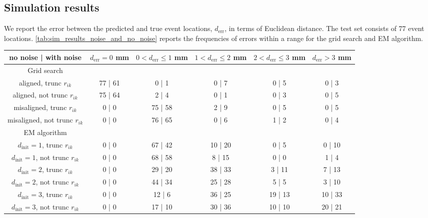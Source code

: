 \subsection{Simulation results}

We report the error between the predicted and true event locations, 
$d_{\text{err}}$, in terms of Euclidean distance. 
The test set consists of 77 event locations.
\cref{tab:sim_results_noise_and_no_noise} reports the frequencies of errors  
within a range for the grid search and EM algorithm.

\begin{table*}
\begin{tabular}{ |c|ccccc| } 
 \hline
 no noise | with noise  & $d_{\text{err}}=0$ mm & $0<d_{\text{err}}\leq1$ mm & $1<d_{\text{err}}\leq2$ mm & $2<d_{\text{err}}\leq3$ mm & $d_{\text{err}}>3$ mm \\ 
 \hline
 Grid search & & & & & \\
 aligned, trunc $r_{ik}$        & 77 | 61 & 0 | 1 & 0 | 7 & 0 | 5 & 0 | 3 \\ 
 aligned, not trunc $r_{ik}$    & 75 | 64  & 2 | 4 & 0 | 1 & 0 | 3 & 0 | 5 \\ 
 misaligned, trunc $r_{ik}$     & 0 | 0  & 75 | 58 & 2 | 9 & 0 | 5 & 0 | 5 \\
 misaligned, not trunc $r_{ik}$ & 0 | 0  & 76 | 65 & 0 | 6 & 1 | 2 & 0 | 4 \\
 \hline
 EM algorithm & & & & & \\
 $d_\text{init}=1$, trunc $r_{ik}$       & 0 | 0  & 67 | 42 & 10 | 20 & 0 | 5 & 0 | 10 \\
 $d_\text{init}=1$, not trunc $r_{ik}$   & 0 | 0  & 68 | 58 & 8 | 15 & 0 | 0 & 1 | 4 \\
 $d_\text{init}=2$, trunc $r_{ik}$       & 0 | 0  & 29 | 20 & 38 | 33 & 3 | 11 & 7 | 13 \\
 $d_\text{init}=2$, not trunc $r_{ik}$   & 0 | 0  & 44 | 34 & 25 | 28 & 5 | 5 & 3 | 10 \\
 $d_\text{init}=3$, trunc $r_{ik}$       & 0 | 0  & 12 | 6 & 36 | 25 & 19 | 13 & 10 | 33 \\
 $d_\text{init}=3$, not trunc $r_{ik}$   & 0 | 0  & 17 | 10 & 30 | 36 & 10 | 10 & 20 | 21 \\
 \hline
\end{tabular}
\caption{\textbf{Simulation localization error.} The frequencies of localization 
error ($d_{\text{err}}$) within a range for each algorithm and testing 
configuration. The left side and right sides of a column correspond to images 
without and with added dark counts, respectively.}
\label{tab:sim_results_noise_and_no_noise}
\end{table*}


